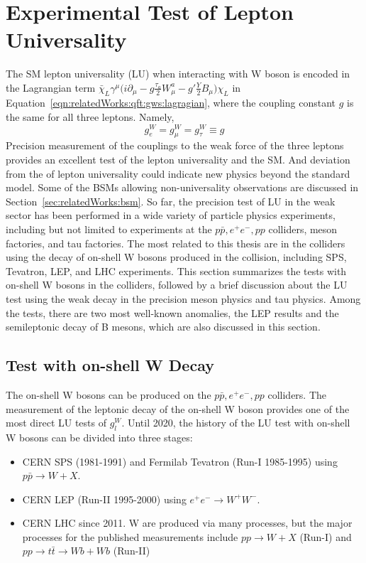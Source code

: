 
\section{Experimental Test of Lepton Universality}
\label{sec:relatedWorks:lu}

The SM lepton universality (LU) when interacting with W boson is encoded in the Lagrangian term $\bar{\chi}_L \gamma^\mu \big( i \partial_\mu -g \frac{\tau_a}{2} W^a_\mu -g'\frac{Y}{2} B_\mu \big) \chi_L $ in Equation~\ref{eqn:relatedWorks:qft:gws:lagragian}, where the coupling constant $g$ is the same for all three leptons. Namely,
\begin{equation}
	g_e^W = g_\mu^W = g_\tau^W \equiv g
\end{equation}
Precision measurement of the couplings to the weak force of the three leptons provides an excellent test of the lepton universality and the SM. And deviation from the of lepton universality could indicate new physics beyond the standard model. Some of the BSMs allowing non-universality observations are discussed in Section~\ref{sec:relatedWorks:bsm}. So far, the precision test of LU in the weak sector has been performed in a wide variety of particle physics experiments, including but not limited to experiments at the $p\bar{p}, e^+ e^-, pp$ colliders, meson factories, and tau factories. The most related to this thesis are in the colliders using the decay of on-shell W bosons produced in the collision, including SPS, Tevatron, LEP, and LHC experiments. This section summarizes the tests with on-shell W bosons in the colliders, followed by a brief discussion about the LU test using the weak decay in the precision meson physics and tau physics. Among the tests, there are two most well-known anomalies, the LEP results and the semileptonic decay of B mesons, which are also discussed in this section. 


\subsection{Test with on-shell W Decay}
\label{sec:relatedWorks:lu:W}


The on-shell W bosons can be produced on the  $p\bar{p}, e^+ e^-, pp$ colliders. The measurement of the leptonic decay of the on-shell W boson provides one of the most direct LU tests of $g^W_l$. Until 2020, the history of the LU test with on-shell W bosons can be divided into three stages:

\begin{itemize}
    \item CERN SPS (1981-1991) and Fermilab Tevatron (Run-I 1985-1995) using $p \bar{p} \to W + X$.
    \item CERN LEP (Run-II 1995-2000) using $e^+e^- \to W^+  W^-$.
    \item CERN LHC since 2011. W are produced via many processes, but the major processes for the published measurements include $pp \to W +X$ (Run-I) and $pp \to t \bar{t} \to Wb+Wb$ (Run-II)
\end{itemize}

